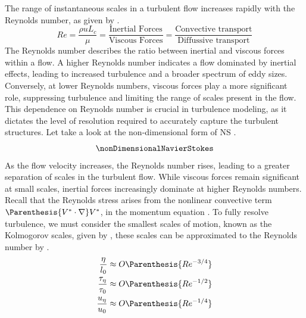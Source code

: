 The range of instantaneous scales in a turbulent flow increases rapidly with
the Reynolds number, as given by  \cite{Moin1998}.
\begin{equation}\label{eq:reynoldsNumber}
    Re = \frac{\rho u L_c}{\mu}  = \frac{\text{Inertial Forces}}{\text{Viscous
    Forces}} = \frac{\text{Convective transport}}{\text{Diffussive transport}} 
\end{equation}
The Reynolds number describes the ratio between inertial and viscous forces
within a flow. A higher Reynolds number indicates a flow dominated by inertial
effects, leading to increased turbulence and a broader spectrum of eddy sizes.
Conversely, at lower Reynolds numbers, viscous forces play a more significant
role, suppressing turbulence and limiting the range of scales present in the
flow. This dependence on Reynolds number is crucial in turbulence modeling, as
it dictates the level of resolution required to accurately capture the
turbulent structures. Let take a look at the non-dimensional form of \gls{NS}
.
\begin{equation}\label{eq:nonDimensionalNavierStokes}
    \nonDimensionalNavierStokes
\end{equation}
As the flow velocity increases, the Reynolds number rises, leading to a greater
separation of scales in the turbulent flow. While viscous forces remain
significant at small scales, inertial forces increasingly dominate at higher
Reynolds numbers. Recall that the Reynolds stress arises from the nonlinear
convective term $\Parenthesis{ V^* \cdot \nabla} V^*$, in the momentum
equation . To fully resolve turbulence, we must consider
the smallest scales of motion, known as the Kolmogorov scales, given by
, these scales can be approximated to the Reynolds number by .
\begin{subequations}\label{eq:kolmogorovScalesApproximation}
    \begin{align}
        \frac{\eta}{l_0} \approx O\Parenthesis{Re^{-3/4}} \label{eq:kolmogorovLengthApprox} \\
        \frac{\tau_{\eta}}{\tau_0} \approx O\Parenthesis{Re^{-1/2}} \label{eq:kolmogorovTimeApprox} \\
        \frac{u_{\eta}}{u_0} \approx O\Parenthesis{Re^{-1/4} }\label{eq:kolmogorovVelocityAppprox} 
    \end{align}
\end{subequations}

